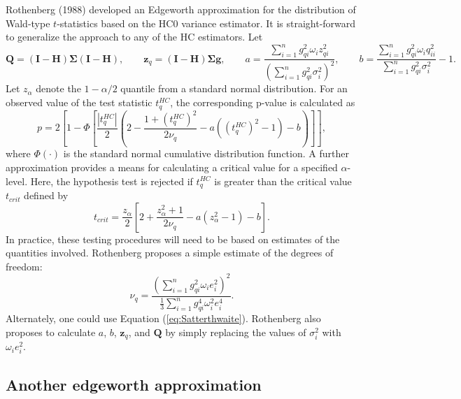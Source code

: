 \documentclass{article}\usepackage[]{graphicx}\usepackage[]{color}
\newcommand{\bm}{\mathbf}
\newcommand{\bs}{\boldsymbol}
\begin{document}
Rothenberg (1988) developed an Edgeworth approximation for the distribution of Wald-type $t$-statistics based on the HC0 variance estimator. It is straight-forward to generalize the approach to any of the HC estimators. Let \[
\bm{Q} = \left(\bm{I} - \bm{H}\right)\bs\Sigma\left(\bm{I} - \bm{H}\right), \qquad \bm{z}_q = \left(\bm{I} - \bm{H}\right)\bs\Sigma \bm{g}, \qquad a = \frac{\sum_{i=1}^n g_{qi}^2 \omega_i z_{qi}^2}{\left(\sum_{i=1}^n g_{qi}^2 \sigma_i^2\right)^2}, \qquad b = \frac{\sum_{i=1}^n g_{qi}^2 \omega_i q_{ii}^2}{\sum_{i=1}^n g_{qi}^2 \sigma_i^2} - 1. \]
Let $z_{\alpha}$ denote the $1 - \alpha / 2$ quantile from a standard normal distribution. For an observed value of the test statistic $t^{HC}_q$, the corresponding p-value is calculated as \[
p = 2 \left[1 - \Phi\left[\frac{\left|t^{HC}_q\right|}{2}\left(2 - \frac{1 + \left(t^{HC}_q\right)^2}{2 \nu_q} - a\left(\left(t^{HC}_q\right)^2 - 1\right) - b\right)\right]\right], \]
where $\Phi(\cdot)$ is the standard normal cumulative distribution function. A further approximation provides a means for calculating a critical value for a specified $\alpha$-level. Here, the hypothesis test is rejected if $t^{HC}_q$ is greater than the critical value $t_{crit}$ defined by \[
t_{crit} = \frac{z_{\alpha}}{2}\left[2 + \frac{z_{\alpha}^2 + 1}{2 \nu_q} - a\left(z_{\alpha}^2 - 1\right) - b\right]. \]
In practice, these testing procedures will need to be based on estimates of the quantities involved. Rothenberg proposes a simple estimate of the degrees of freedom: \[
\nu_q = \frac{\left(\sum_{i=1}^n g_{qi}^2 \omega_i e_i^2\right)^2}{\frac{1}{3}\sum_{i=1}^n g_{qi}^4 \omega_i^2 e_i^4}.
\]
Alternately, one could use Equation (\ref{eq:Satterthwaite}). Rothenberg also proposes to calculate $a$, $b$, $\bm{z}_q$, and $\bm{Q}$ by simply replacing the values of $\sigma_i^2$ with $\omega_i e_i^2$.

\subsection{Another edgeworth approximation}
\end{document}
